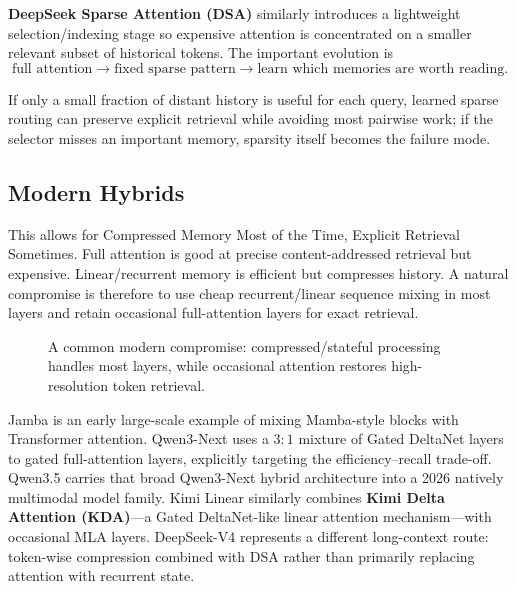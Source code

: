 \textbf{DeepSeek Sparse Attention (DSA)} similarly introduces a lightweight selection/indexing stage so expensive attention is concentrated on a smaller relevant subset of historical tokens.
The important evolution is
\[
\text{full attention}
\rightarrow
\text{fixed sparse pattern}
\rightarrow
\text{learn which memories are worth reading}.
\]

\begin{calloutbias}
If only a small fraction of distant history is useful for each query, learned sparse routing can preserve explicit retrieval while avoiding most pairwise work; if the selector misses an important memory, sparsity itself becomes the failure mode.
\end{calloutbias}

\subsection{Modern Hybrids}
This allows for Compressed Memory Most of the Time, Explicit Retrieval Sometimes.
Full attention is good at precise content-addressed retrieval but expensive.
Linear/recurrent memory is efficient but compresses history.
A natural compromise is therefore to use cheap recurrent/linear sequence mixing in most layers and retain occasional full-attention layers for exact retrieval.

\begin{figure}[htbp]
\centering
{}
\caption{A common modern compromise: compressed/stateful processing handles most layers, while occasional attention restores high-resolution token retrieval.}
\label{fig:modern-hybrid-attention}
\end{figure}

Jamba is an early large-scale example of mixing Mamba-style blocks with Transformer attention.
Qwen3-Next uses a $3{:}1$ mixture of Gated DeltaNet layers to gated full-attention layers, explicitly targeting the efficiency--recall trade-off.
Qwen3.5 carries that broad Qwen3-Next hybrid architecture into a 2026 natively multimodal model family.
Kimi Linear similarly combines \textbf{Kimi Delta Attention (KDA)}---a Gated DeltaNet-like linear attention mechanism---with occasional MLA layers.
DeepSeek-V4 represents a different long-context route: token-wise compression combined with DSA rather than primarily replacing attention with recurrent state.

